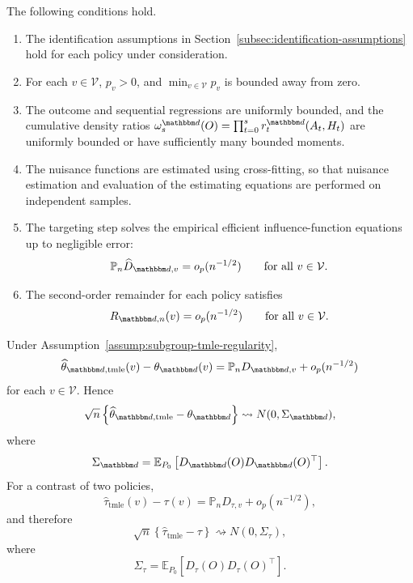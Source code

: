 \documentclass[11pt]{article}
\begin{document}
\begin{assumption}
\label{assump:subgroup-tmle-regularity}
The following conditions hold.
\begin{enumerate}
  \item The identification assumptions in
  Section~\ref{subsec:identification-assumptions} hold for each policy under
  consideration.

  \item For each \(v\in\mathcal V\), \(p_v>0\), and
  \(\min_{v\in\mathcal V}p_v\) is bounded away from zero.

  \item The outcome and sequential regressions are uniformly bounded, and the
  cumulative density ratios
  \(\omega_s^{\mathbbm d}(O)=\prod_{t=0}^s r_t^{\mathbbm d}(A_t,H_t)\) are
  uniformly bounded or have sufficiently many bounded moments.

  \item The nuisance functions are estimated using cross-fitting, so that
  nuisance estimation and evaluation of the estimating equations are performed
  on independent samples.

  \item The targeting step solves the empirical efficient influence-function
  equations up to negligible error:
  \[
    \mathbb{P}_n
    \widehat D_{\mathbbm d,v}
    =
    o_p(n^{-1/2})
    \qquad
    \text{for all }v\in\mathcal V.
  \]

  \item The second-order remainder for each policy satisfies
  \[
    R_{\mathbbm d,n}(v)
    =
    o_p(n^{-1/2})
    \qquad
    \text{for all }v\in\mathcal V.
  \]
\end{enumerate}
\end{assumption}

\begin{theorem}
\label{thm:subgroup-tmle-al}
Under Assumption~\ref{assump:subgroup-tmle-regularity},
\[
  \widehat\theta_{\mathbbm d,\mathrm{tmle}}(v)
  -
  \theta_{\mathbbm d}(v)
  =
  \mathbb{P}_n D_{\mathbbm d,v}
  +
  o_p(n^{-1/2})
\]
for each \(v\in\mathcal V\). Hence
\[
  \sqrt n
  \left\{
    \widehat\theta_{\mathbbm d,\mathrm{tmle}}
    -
    \theta_{\mathbbm d}
  \right\}
  \rightsquigarrow
  N(0,\Sigma_{\mathbbm d}),
\]
where
\[
  \Sigma_{\mathbbm d}
  =
  \mathbb{E}_{P_0}
  \left[
    D_{\mathbbm d}(O)D_{\mathbbm d}(O)^\top
  \right].
\]
For a contrast of two policies,
\[
  \widehat\tau_{\mathrm{tmle}}(v)-\tau(v)
  =
  \mathbb{P}_n D_{\tau,v}
  +
  o_p(n^{-1/2}),
\]
and therefore
\[
  \sqrt n
  \left\{
    \widehat\tau_{\mathrm{tmle}}
    -
    \tau
  \right\}
  \rightsquigarrow
  N(0,\Sigma_\tau),
\]
where
\[
  \Sigma_\tau
  =
  \mathbb{E}_{P_0}
  \left[
    D_\tau(O)D_\tau(O)^\top
  \right].
\]
\end{theorem}
\end{document}
